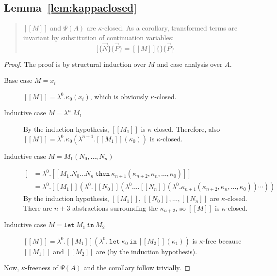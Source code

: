 \documentclass[a4paper,11pt,draft]{article}
\newcommand{\kw}[1]{\mathtt{#1}}
\begin{document}
\subsection{Lemma~\ref{lem:kappaclosed}}

\begin{quote}
  $[\![M]\!]$ and $\Psi(A)$ are $\kappa$-closed. As a corollary, transformed
  terms are invariant by substitution of continuation variables:
  \begin{equation*}
    [\![M]\!]\{\vec{N}\}\{\vec{P}\} = [\![M]\!]\{\}\{\vec{P}\}
  \end{equation*}
\end{quote}

\begin{proof}
The proof is by structural induction over $M$ and case analysis over $A$.

\begin{description}
\item[\sffamily Base case $M = x_{i}$]\hfill

  $[\![M]\!] = \lambda^{0}.\kappa_{0}(x_{i})$, which is obviously $\kappa$-closed.

\item[\sffamily Inductive case $M = \lambda^{n}.M_{1}$]\hfill

  By the induction hypothesis, $[\![M_{1}]\!]$ is $\kappa$-closed. Therefore, also
  $[\![M]\!] = \lambda^{0}.\kappa_{0}(\lambda^{n+1}.[\![M_{1}]\!](\kappa_{0}))$ is
  $\kappa$-closed.

\item[\sffamily Inductive case $M = M_{1}(N_{0}, \ldots, N_{n})$]\hfill
  \begin{align*}
    [\![M]\!] &= \lambda^{0}.[\![M_{1}.N_{0} \ldots N_{n} \: \kw{then} \: \kappa_{n+1}(\kappa_{n+2}, \kappa_{n}, \ldots, \kappa_{0})]\!] \\
              &= \lambda^{0}.[\![M_{1}]\!](\lambda^{0}.[\![N_{0}]\!](\lambda^{0}. \ldots [\![N_{n}]\!](\lambda^{0}.\kappa_{n+1}(\kappa_{n+2}, \kappa_{n}, \ldots, \kappa_{0})) \cdots ))
  \end{align*}
  By the induction hypothesis, $[\![M_{1}]\!]$, $[\![N_{0}]\!], \ldots, [\![N_{n}]\!]$ are $\kappa$-closed.
  There are $n+3$ abstractions surrounding the $\kappa_{n+2}$, so $[\![M]\!]$ is $\kappa$-closed.

\item[\sffamily Inductive case $M = \kw{let} \: M_{1} \: \kw{in} \: M_{2}$]\hfill

  $[\![M]\!] = \lambda^{0}.[\![M_{1}]\!](\lambda^{0}. \: \kw{let} \: \kappa_{0} \: \kw{in} \: [\![M_{2}]\!](\kappa_{1}))$
  is $\kappa$-free because $[\![M_{1}]\!]$ and $[\![M_{2}]\!]$ are (by the induction hypothesis).
\end{description}

Now, $\kappa$-freeness of $\Psi(A)$ and the corollary follow trivially.
\end{proof}
\end{document}

